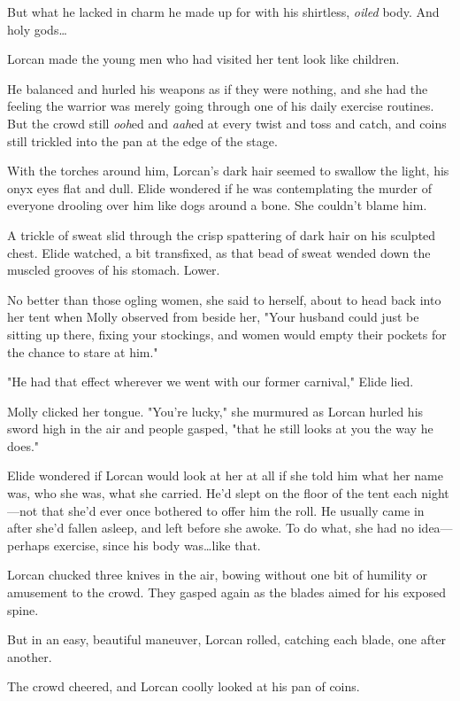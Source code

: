 But what he lacked in charm he made up for with his shirtless,
\emph{oiled} body.
And holy gods\ldots{}

Lorcan made the young men who had visited her tent look like 
children.

He balanced and hurled his weapons as if they were nothing, and she had the feeling the warrior was merely going through one of his daily exercise routines.
But the crowd still \emph{ooh}ed and \emph{aah}ed at every twist and toss and catch, and coins still trickled into the pan at the edge of the stage.

With the torches around him, Lorcan's dark hair seemed to swallow the light, his onyx eyes flat and dull.
Elide wondered if he was contemplating the murder of everyone drooling over him like dogs around a bone.
She couldn't blame him.

A trickle of sweat slid through the crisp spattering of dark hair on his sculpted chest.
Elide watched, a bit transfixed, as that bead of sweat wended down the muscled grooves of his stomach.
Lower.

No better than those ogling women, she said to herself, about to head back into her tent when Molly observed from beside her, "Your husband could just be sitting up there, fixing your stockings, and women would empty their pockets for the chance to stare at him."

"He had that effect wherever we went with our former carnival," Elide lied.

Molly clicked her tongue.
"You're lucky," she murmured as Lorcan hurled his sword high in the air and people gasped, "that he still looks at you the way he does."

Elide wondered if Lorcan would look at her at all if she told him what her name was, who she was, what she carried.
He'd slept on the floor of the tent each night---not that she'd ever once bothered to offer him the roll.
He usually came in after she'd fallen asleep, and left before she awoke.
To do what, she had no idea---perhaps exercise, since his body was\ldots like that.

Lorcan chucked three knives in the air, bowing without one bit of humility or amusement to the crowd.
They gasped again as the blades aimed for his exposed spine.

But in an easy, beautiful maneuver, Lorcan rolled, catching each blade, one after another.

The crowd cheered, and Lorcan coolly looked at his pan of coins.

